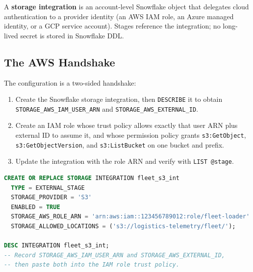 \begin{definitionbox}
A \textbf{storage integration} is an account-level Snowflake object that delegates cloud authentication to a provider identity (an AWS IAM role, an Azure managed identity, or a GCP service account). Stages reference the integration; no long-lived secret is stored in Snowflake DDL.
\end{definitionbox}

\subsection{The AWS Handshake}
The configuration is a two-sided handshake:
\begin{enumerate}
    \item Create the Snowflake storage integration, then \texttt{DESCRIBE} it to obtain \texttt{STORAGE\_AWS\_IAM\_USER\_ARN} and \texttt{STORAGE\_AWS\_EXTERNAL\_ID}.
    \item Create an IAM role whose trust policy allows exactly that user ARN plus external ID to assume it, and whose permission policy grants \texttt{s3:GetObject}, \texttt{s3:GetObjectVersion}, and \texttt{s3:ListBucket} on one bucket and prefix.
    \item Update the integration with the role ARN and verify with \texttt{LIST @stage}.
\end{enumerate}

\begin{lstlisting}[language=SQL, caption={Creating and inspecting an S3 storage integration}]
CREATE OR REPLACE STORAGE INTEGRATION fleet_s3_int
  TYPE = EXTERNAL_STAGE
  STORAGE_PROVIDER = 'S3'
  ENABLED = TRUE
  STORAGE_AWS_ROLE_ARN = 'arn:aws:iam::123456789012:role/fleet-loader'
  STORAGE_ALLOWED_LOCATIONS = ('s3://logistics-telemetry/fleet/');

DESC INTEGRATION fleet_s3_int;
-- Record STORAGE_AWS_IAM_USER_ARN and STORAGE_AWS_EXTERNAL_ID,
-- then paste both into the IAM role trust policy.
\end{lstlisting}

